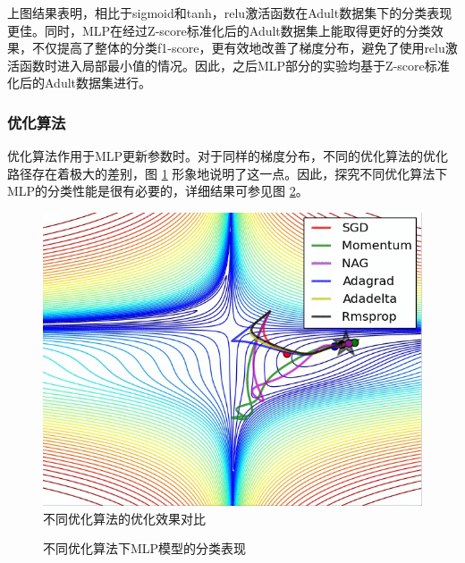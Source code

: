 \documentclass[12pt,a4paper]{article}
\theoremstyle{definition}
\begin{document}
上图结果表明，相比于sigmoid和tanh，relu激活函数在Adult数据集下的分类表现更佳。同时，MLP在经过Z-score标准化后的Adult数据集上能取得更好的分类效果，不仅提高了整体的分类f1-score，更有效地改善了梯度分布，避免了使用relu激活函数时进入局部最小值的情况。因此，之后MLP部分的实验均基于Z-score标准化后的Adult数据集进行。

\subsubsection{优化算法}

优化算法作用于MLP更新参数时。对于同样的梯度分布，不同的优化算法的优化路径存在着极大的差别，图 \ref{fig:optim-ref} 形象地说明了这一点。因此，探究不同优化算法下MLP的分类性能是很有必要的，详细结果可参见图 \ref{fig:optim1}。

\begin{figure}[H]
	\centering
	\includegraphics[width=0.5\linewidth]{img/optim_example.png}
	\caption{不同优化算法的优化效果对比 \cite{optim_example}}
	\label{fig:optim-ref}
\end{figure}

\begin{figure}[H]
	\centering
	\caption{不同优化算法下MLP模型的分类表现}
	\label{fig:optim1}
\end{figure}
\end{document}
